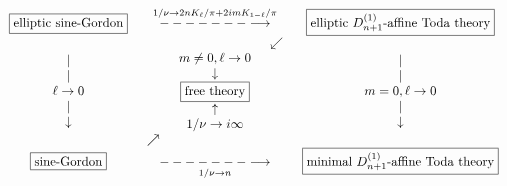 \begin{equation}
\begin{array}{ccc}
\fbox{elliptic sine-Gordon} & \overset{1/\nu \rightarrow 2nK_{\ell }/\pi
+2imK_{1-\ell }/\pi }{-------\longrightarrow } & \fbox{elliptic $%
D_{n+1}^{(1)}$-affine Toda theory} \\ 
\begin{array}{c}
| \\ 
| \\ 
\ell \rightarrow 0 \\ 
| \\ 
\downarrow%
\end{array}
& 
\begin{array}{ccc}
&  & \swarrow \\ 
& 
\begin{array}{c}
m\neq 0,\ell \rightarrow 0 \\ 
\downarrow \\ 
\fbox{free theory} \\ 
\uparrow \\ 
1/\nu \rightarrow i\infty%
\end{array}
&  \\ 
\nearrow &  & 
\end{array}
& 
\begin{array}{c}
| \\ 
| \\ 
m=0,\ell \rightarrow 0 \\ 
| \\ 
\downarrow%
\end{array}
\\ 
\fbox{sine-Gordon} & \underset{1/\nu \rightarrow n}{-------\longrightarrow }
& \fbox{minimal $D_{n+1}^{(1)}$-affine Toda theory}%
\end{array}
\label{diagram}
\end{equation}

